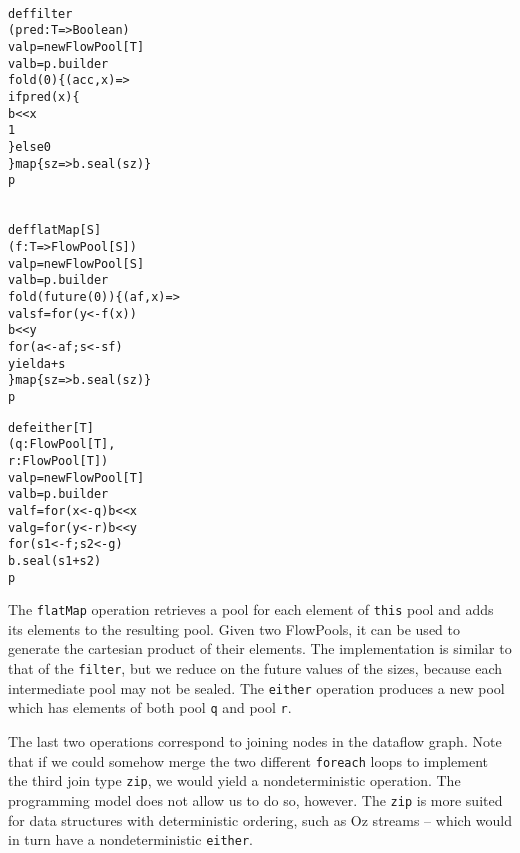 \documentclass[runningheads,a4paper]{llncs}
\begin{document}
\noindent
\begin{minipage}[b]{4 cm}
\begin{alltt}
{\scriptsize
def filter
  (pred: T => Boolean)
  val p = new FlowPool[T]
  val b = p.builder
  fold(0) \{ (acc, x) =>
    if pred(x) \{
      b << x
      1
    \} else 0
  \} map \{ sz => b.seal(sz) \}
  p
}
\end{alltt}
\end{minipage}\begin{minipage}[b]{4.3 cm}
\begin{alltt}
{\scriptsize
def flatMap[S]
  (f: T => FlowPool[S])
  val p = new FlowPool[S]
  val b = p.builder
  fold(future(0)) \{ (af, x) =>
    val sf = for (y <- f(x))
      b << y
    for (a <- af; s <- sf)
      yield a + s
  \} map \{ sz => b.seal(sz) \}
  p
}
\end{alltt}
\end{minipage}
\begin{minipage}[b]{4 cm}
\begin{alltt}
{\scriptsize
def either[T]
  (q: FlowPool[T],
   r: FlowPool[T])
  val p = new FlowPool[T]
  val b = p.builder
  val f = for (x <- q) b << x
  val g = for (y <- r) b << y
  for (s1 <- f; s2 <- g)
    b.seal(s1 + s2)
  p

}
\end{alltt}
\end{minipage}

The \verb=flatMap= operation retrieves a pool for each element of
\verb=this= pool and adds its elements to the resulting pool.
Given two FlowPools, it can be used to generate the cartesian product
of their elements.
The implementation is similar to that of the \verb=filter=,
but we reduce on the future values of the sizes, because each
intermediate pool may not be sealed.
The \verb=either= operation produces a new pool which has elements of
both pool \verb=q= and pool \verb=r=.

The last two operations correspond to joining nodes in the dataflow
graph.
Note that if we could somehow merge the two different \verb=foreach=
loops to implement the third join type \verb=zip=, we would
yield a nondeterministic operation.
The programming model does not allow us to do so, however.
The \verb=zip= is more suited for data structures with deterministic ordering,
such as Oz streams -- which would in turn have a nondeterministic \verb=either=.
\end{document}
